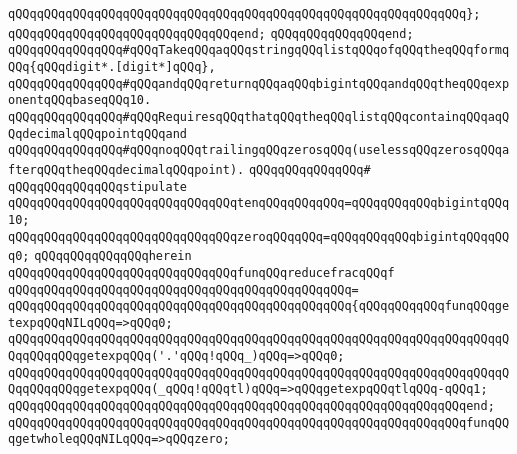 \verb|qQQqqQQqqQQqqQQqqQQqqQQqqQQqqQQqqQQqqQQqqQQqqQQqqQQqqQQqqQQqqQQq};|\newline
\verb|qQQqqQQqqQQqqQQqqQQqqQQqqQQqqQQqend;|\newline
\verb|qQQqqQQqqQQqqQQqend;|\newline
\newline
\verb|qQQqqQQqqQQqqQQq#qQQqTakeqQQqaqQQqstringqQQqlistqQQqofqQQqtheqQQqformqQQq{qQQqdigit*.[digit*]qQQq},|\newline
\verb|qQQqqQQqqQQqqQQq#qQQqandqQQqreturnqQQqaqQQqbigintqQQqandqQQqtheqQQqexponentqQQqbaseqQQq10.|\newline
\verb|qQQqqQQqqQQqqQQq#qQQqRequiresqQQqthatqQQqtheqQQqlistqQQqcontainqQQqaqQQqdecimalqQQqpointqQQqand|\newline
\verb|qQQqqQQqqQQqqQQq#qQQqnoqQQqtrailingqQQqzerosqQQq(uselessqQQqzerosqQQqafterqQQqtheqQQqdecimalqQQqpoint).|\newline
\verb|qQQqqQQqqQQqqQQq#|\newline
\verb|qQQqqQQqqQQqqQQqstipulate|\newline
\newline
\verb|qQQqqQQqqQQqqQQqqQQqqQQqqQQqqQQqtenqQQqqQQqqQQq=qQQqqQQqqQQqbigintqQQq10;|\newline
\verb|qQQqqQQqqQQqqQQqqQQqqQQqqQQqqQQqzeroqQQqqQQq=qQQqqQQqqQQqbigintqQQqqQQq0;|\newline
\newline
\verb|qQQqqQQqqQQqqQQqherein|\newline
\newline
\verb|qQQqqQQqqQQqqQQqqQQqqQQqqQQqqQQqfunqQQqreducefracqQQqf|\newline
\verb|qQQqqQQqqQQqqQQqqQQqqQQqqQQqqQQqqQQqqQQqqQQqqQQq=|\newline
\verb|qQQqqQQqqQQqqQQqqQQqqQQqqQQqqQQqqQQqqQQqqQQqqQQq{qQQqqQQqqQQqfunqQQqgetexpqQQqNILqQQq=>qQQq0;|\newline
\verb|qQQqqQQqqQQqqQQqqQQqqQQqqQQqqQQqqQQqqQQqqQQqqQQqqQQqqQQqqQQqqQQqqQQqqQQqqQQqqQQqgetexpqQQq('.'qQQq!qQQq_)qQQq=>qQQq0;|\newline
\verb|qQQqqQQqqQQqqQQqqQQqqQQqqQQqqQQqqQQqqQQqqQQqqQQqqQQqqQQqqQQqqQQqqQQqqQQqqQQqqQQqgetexpqQQq(_qQQq!qQQqtl)qQQq=>qQQqgetexpqQQqtlqQQq-qQQq1;|\newline
\verb|qQQqqQQqqQQqqQQqqQQqqQQqqQQqqQQqqQQqqQQqqQQqqQQqqQQqqQQqqQQqqQQqend;|\newline
\newline
\verb|qQQqqQQqqQQqqQQqqQQqqQQqqQQqqQQqqQQqqQQqqQQqqQQqqQQqqQQqqQQqqQQqfunqQQqgetwholeqQQqNILqQQq=>qQQqzero;|\newline
